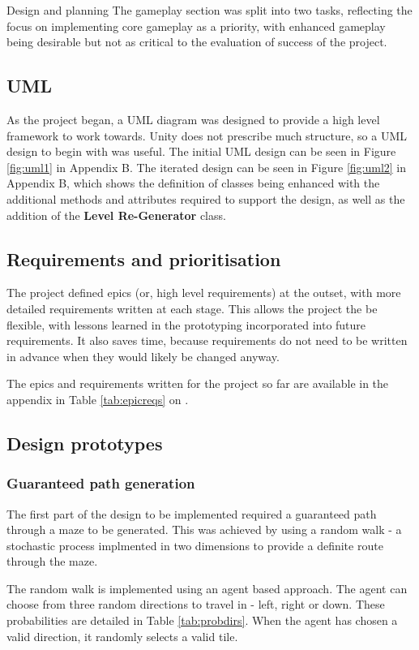 \documentclass[final]{cmpreport}
\begin{document}
\begin{section}{Design and planning}
The gameplay section was split into two tasks, reflecting the focus on implementing core gameplay as a priority, with enhanced gameplay being desirable but not as critical to the evaluation of success of the project.

\subsection{UML}

As the project began, a UML diagram was designed to provide a high level framework to work towards. Unity does not prescribe much structure, so a UML design to begin with was useful. The initial UML design can be seen in Figure \ref{fig:uml1} in Appendix B. The iterated design can be seen in Figure \ref{fig:uml2} in Appendix B, which shows the definition of classes being enhanced with the additional methods and attributes required to support the design, as well as the addition of the \textbf{Level Re-Generator} class.


\subsection{Requirements and prioritisation}

The project defined epics (or, high level requirements) at the outset, with more detailed requirements written at each stage. This allows the project the be flexible, with lessons learned in the prototyping incorporated into future requirements. It also saves time, because requirements do not need to be written in advance when they would likely be changed anyway.

The epics and requirements written for the project so far are available in the appendix in Table \ref{tab:epicreqs} on \pageref{tab:epicreqs}.


\subsection{Design prototypes}
\subsubsection{Guaranteed path generation}
The first part of the design to be implemented required a guaranteed path through a maze to be generated. This was achieved by using a random walk - a stochastic process implmented in two dimensions to provide a definite route through the maze.

The random walk is implemented using an agent based approach. The agent can choose from three random directions to travel in - left, right or down. These probabilities are detailed in Table \ref{tab:probdirs}. When the agent has chosen a valid direction, it randomly selects a valid tile. 


\end{section}
\end{document}
